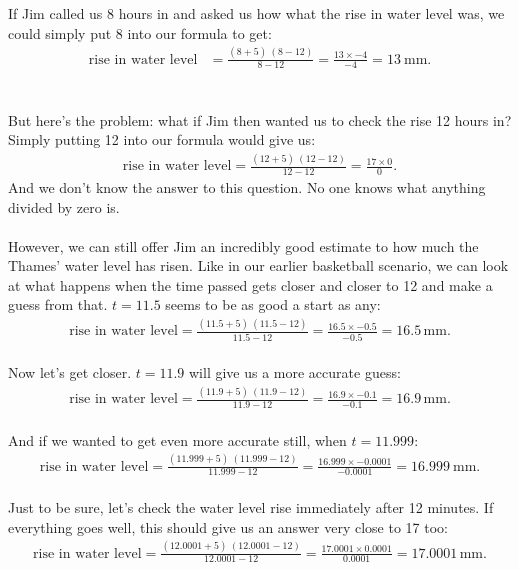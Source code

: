 \documentclass[11pt]{article}
\numberwithin{equation}{section}
\begin{document}
If Jim called us 8 hours in and asked us how what the rise in water level was, we could simply put 8 into our formula to get:
\begin{align*}
\textrm{rise in water level} &= \frac{(8 + 5) \ (8 - 12)}{8 - 12} = \frac{13 \times -4}{-4} = 13 \ \textrm{mm.}
\end{align*}
\\ \\ 
But here's the problem: what if Jim then wanted us to check the rise 12 hours in? Simply putting 12 into our formula would give us:
\begin{align*}
\textrm{rise in water level} = \frac{(12 + 5) \ (12 - 12)}{12 - 12} = \frac{17 \times 0}{0}.
\end{align*}
And we don't know the answer to this question. No one knows what anything divided by zero is. 
\\ \\
However, we can still offer Jim an incredibly good estimate to how much the Thames' water level has risen. Like in our earlier basketball scenario, we can look at what happens when the time passed gets closer and closer to 12 and make a guess from that. \(t = 11.5\) seems to be as good a start as any:
\begin{align*}
\textrm{rise in water level} = \frac{(11.5 + 5) \ (11.5 - 12)}{11.5 - 12} = \frac{16.5 \times -0.5}{-0.5} = 16.5 \, \textrm{mm.}
\end{align*}
\\ Now let's get closer. \(t = 11.9\) will give us a more accurate guess:
\begin{align*}
\textrm{rise in water level} = \frac{(11.9 + 5) \ (11.9 - 12)}{11.9 - 12} = \frac{16.9 \times -0.1}{-0.1} = 16.9 \, \textrm{mm.}
\end{align*}
\\ And if we wanted to get even more accurate still, when \(t = 11.999\):
\begin{align*}
\textrm{rise in water level} = \frac{(11.999 + 5) \ (11.999 - 12)}{11.999 - 12} = \frac{16.999 \times -0.0001}{-0.0001} = 16.999 \ \textrm{mm.}
\end{align*}
\\ Just to be sure, let's check the water level rise immediately after 12 minutes. If everything goes well, this should give us an answer very close to 17 too:
\begin{align*}
\textrm{rise in water level} = \frac{(12.0001 + 5) \ (12.0001 - 12)}{12.0001 - 12} = \frac{17.0001 \times 0.0001}{0.0001} = 17.0001 \, \textrm{mm.}
\end{align*}
\end{document}

